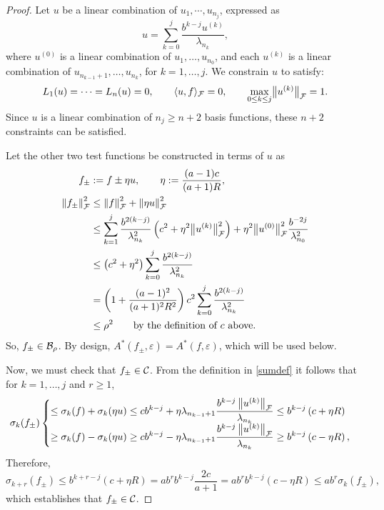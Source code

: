 \documentclass[graybox,footinfo]{svmult}
\newcommand{\DHJRnorm}[2][{}]{\ensuremath{\left \lVert #2 \right \rVert}_{#1}}
\newcommand{\DHJRbignorm}[2][{}]{\ensuremath{\bigl \lVert #2 \bigr \rVert}_{#1}}
\begin{document}
\begin{proof}
Let $u$ be a linear combination of $u_1, \cdots, u_{n_j}$, expressed as
\[
u =  \sum_{k=0}^{j}\frac{b^{k-j}u^{(k)}}{\lambda_{n_k}},
\]
where $u^{(0)}$ is a linear combination of $u_{1}, \ldots, u_{n_0}$, and each $u^{(k)}$ is a linear combination of $u_{n_{k-1}+1}, \ldots, u_{n_k}$, for $k =1, \ldots, j$.  We constrain $u$ to satisfy:
\begin{equation}\label{uConstraint}
L_1(u) = \cdots = L_n(u) = 0, \qquad \langle u,f \rangle_{\calF} = 0, \qquad 
\max_{0\le k\le j} \DHJRbignorm[\calF]{u^{(k)}} = 1.
\end{equation}
Since $u$ is a linear combination of $n_j  \ge n+2$ basis functions, these $n+2$ constraints can be satisfied.

Let the other two test functions be constructed in terms of $u$ as 
\begin{align}
\label{DHJRetaDef}
f_\pm & := f \pm \eta u, \qquad \eta : =  \frac {(a-1)c}{(a+1)R}, \\
\nonumber
\DHJRnorm[\calF]{f_\pm}^2 & \le \DHJRnorm[\calF]{f}^2 + \DHJRnorm[\calF]{\eta u }^2  \\
& \nonumber 
\le \sum_{k=1}^j \frac{ b^{2(k-j)}}{\lambda^2_{n_{k}}} \left(c^2+ \eta^2 \DHJRbignorm[\calF]{u^{(k)}}^2\right) + \eta^2 \DHJRbignorm[\calF]{u^{(0)}}^2 \frac{b^{-2j}}{\lambda_{n_0}^2}\\
\nonumber
& \le  \left(c^2+ \eta^2 \right) \sum_{k=0}^j \frac{ b^{2(k-j)}}{\lambda^2_{n_{k}}}\\
& \nonumber = \left(1+\frac{(a-1)^2}{(a+1)^{2} R^2 }\right)c^2 \sum_{k=0}^j\frac{ b^{2(k-j)}}{\lambda^2_{n_{k}}} \\
& \nonumber 
\le \rho^2 \qquad \text{by the definition of $c$ above}.
\end{align} 
So, $f_{\pm} \in {\mathcal{B}}_{\rho}$.  By design, $A^*(f_\pm,\varepsilon) = A^*(f,\varepsilon)$, which will be used below.

Now, we must check that $f_\pm \in {\mathcal{C}}$. From the definition in \eqref{sumdef} it follows that for $k = 1, \ldots, j$ and $r \ge 1$,
\begin{equation*}
\sigma_k(f_\pm)  \begin{cases} 
\displaystyle
\le \sigma_k(f) + \sigma_k(\eta u)\le 
c b^{k-j} + \eta\lambda_{n_{k-1}+1}\frac{b^{k-j}\DHJRnorm[\calF]{u^{(k)} } }{\lambda_{n_k}}
\le b^{k-j}\left(c+\eta R \right) 
\\[1ex]
\displaystyle
\ge \sigma_k(f) - \sigma_k(\eta u)\ge 
c b^{k-j} - \eta\lambda_{n_{k-1}+1}\frac{b^{k-j}\DHJRnorm[\calF]{u^{(k)} } }{\lambda_{n_k}}
\ge b^{k-j}\left(c-\eta R \right) , 
\end{cases}
\end{equation*}
Therefore, 
\begin{equation*}
\sigma_{k+r}(f_\pm)
\le b^{k+r-j}(c+\eta R) = ab^r b^{k-j}\frac{2c}{a+1}
=ab^r b^{k-j}\left(c-\eta R \right) \le a b^r \sigma_{k}(f_\pm),
\end{equation*}
which establishes that $f_\pm \in {\mathcal{C}}$.


\end{proof}
\end{document}

